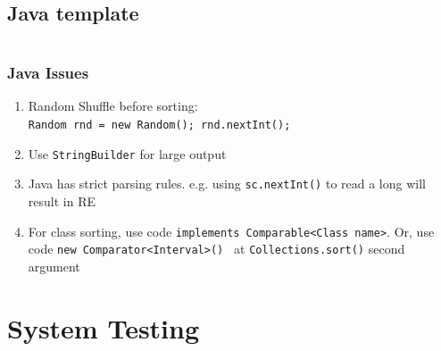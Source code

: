 \documentclass[10pt,oneside]{article}
\begin{document}
\begin{landscape}
\begin{multicols}{2}
% 




\subsection{Java template}
%
\inputminted{java}{contest_setup/Main.java}

\subsubsection{Java Issues}
{\normalsize
\begin{enumerate}
	\item Random Shuffle before sorting:\\ \texttt{Random rnd = new Random(); rnd.nextInt();}
	\item Use \texttt{StringBuilder} for large output
	\item Java has strict parsing rules. e.g. using \texttt{sc.nextInt()} to read a long will result in RE
	\item For class sorting, use code \texttt{implements Comparable<Class name>}. Or, use code \texttt{new Comparator<Interval>() {}} at \texttt{Collections.sort()} second argument
\end{enumerate}
}

\section{System Testing}


\end{multicols}
\end{landscape}
\end{document}
